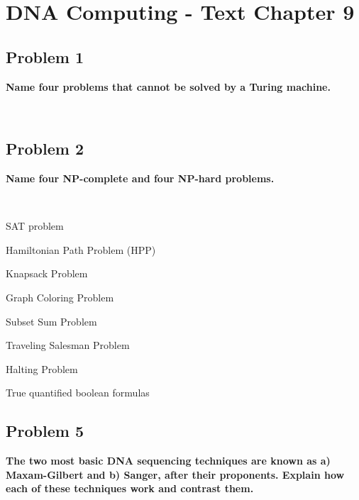
\chapter{DNA Computing - Text Chapter 9}

\section{Problem 1}
\textbf{
Name four problems that cannot be solved by a Turing machine.
}

\hfill \\


\section{Problem 2}
\textbf{
Name four NP-complete and four NP-hard problems.
}

\hfill \\

\begin{minipage}[b]{.5\hsize}
	\begin{description}
	\item{SAT problem}
	\item{Hamiltonian Path Problem (HPP)}
	\item{Knapsack Problem}
	\item{Graph Coloring Problem}
	\end{description}
\end{minipage}	
\begin{minipage}[b]{.5\hsize}
	\begin{description}
	\item{Subset Sum Problem}
	\item{Traveling Salesman Problem}
	\item{Halting Problem}
	\item{True quantified boolean formulas}
	\end{description}
\end{minipage}


\section{Problem 5}
\textbf{
The two most basic DNA sequencing techniques are known as a) Maxam-Gilbert and b) Sanger, after their proponents. Explain how each of these techniques work and contrast them.
}

\hfill \\

